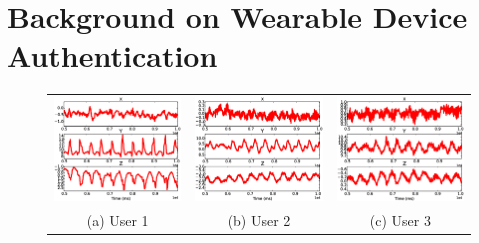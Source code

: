 \section{Background on Wearable Device Authentication}
\label{sec:background}

\begin{figure}[t]
\begin{center}
\begin{tabular}{ccc}
\includegraphics [width=.33\linewidth]{fig/raw_sub1.eps}&
\includegraphics [width=.33\linewidth]{fig/raw_sub8.eps}&
\includegraphics [width=.33\linewidth]{fig/raw_sub3.eps}\\
(a) User 1& (b) User 2 & (c) User 3 \\
\end{tabular}


\end{center}
\end{figure}
